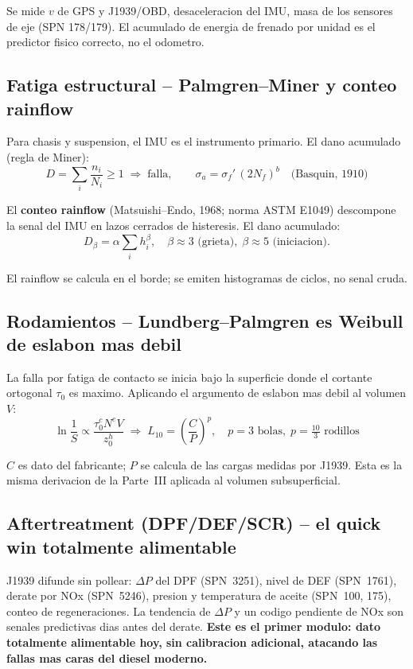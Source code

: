 \documentclass[10.5pt,a4paper]{article}
\begin{document}
Se mide $v$ de GPS y J1939/OBD, desaceleracion del IMU, masa de los sensores de
eje (SPN 178/179). El acumulado de energia de frenado por unidad es el predictor
fisico correcto, no el odometro.

\subsection{Fatiga estructural -- Palmgren--Miner y conteo rainflow}

Para chasis y suspension, el IMU es el instrumento primario. El dano acumulado
(regla de Miner):
$$D = \sum_i \frac{n_i}{N_i} \geq 1 \;\Rightarrow\; \text{falla}, \qquad
  \sigma_a = \sigma_f'\,(2N_f)^b \quad\text{(Basquin, 1910)}$$

El \textbf{conteo rainflow} (Matsuishi--Endo, 1968; norma ASTM E1049) descompone
la senal del IMU en lazos cerrados de histeresis. El dano acumulado:
$$D_\beta = \alpha\sum_i h_i^\beta, \quad \beta \approx 3\text{ (grieta)},\;
  \beta \approx 5 \text{ (iniciacion)}.$$

El rainflow se calcula en el borde; se emiten histogramas de ciclos, no senal cruda.

\subsection{Rodamientos -- Lundberg--Palmgren es Weibull de eslabon mas debil}

La falla por fatiga de contacto se inicia bajo la superficie donde el cortante
ortogonal $\tau_0$ es maximo. Aplicando el argumento de eslabon mas debil al
volumen $V$:
$$\ln\frac{1}{S} \propto \frac{\tau_0^c N^e V}{z_0^h} \;\Longrightarrow\;
  \boxed{L_{10} = \left(\frac{C}{P}\right)^p,\quad p=3\text{ bolas},\;
  p=\tfrac{10}{3}\text{ rodillos}}$$

$C$ es dato del fabricante; $P$ se calcula de las cargas medidas por J1939.
Esta es la misma derivacion de la Parte~III aplicada al volumen subsuperficial.

\subsection{Aftertreatment (DPF/DEF/SCR) -- el quick win totalmente alimentable}

J1939 difunde sin pollear: $\Delta P$ del DPF (SPN~3251), nivel de DEF (SPN~1761),
derate por NOx (SPN~5246), presion y temperatura de aceite (SPN~100, 175),
conteo de regeneraciones. La tendencia de $\Delta P$ y un codigo pendiente de NOx
son senales predictivas dias antes del derate. \textbf{Este es el primer modulo:
dato totalmente alimentable hoy, sin calibracion adicional, atacando las fallas
mas caras del diesel moderno.}
\end{document}
